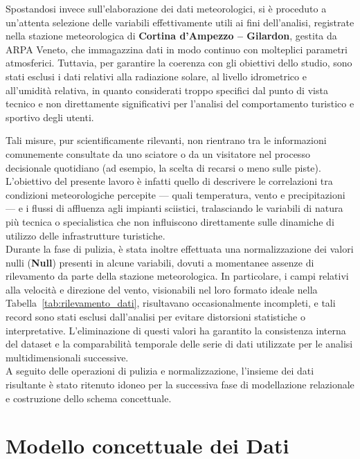 Spostandosi invece sull’elaborazione dei dati meteorologici, si è proceduto a un'attenta selezione delle variabili effettivamente utili ai fini dell’analisi, registrate nella stazione meteorologica di \textbf{Cortina d’Ampezzo – Gilardon}, gestita da ARPA Veneto, che immagazzina dati in modo continuo con  molteplici parametri atmosferici.
Tuttavia, per garantire la coerenza con gli obiettivi dello studio, sono stati esclusi i dati relativi alla radiazione solare, al livello idrometrico e all’umidità relativa, in quanto considerati troppo specifici dal punto di vista tecnico e non direttamente significativi per l’analisi del comportamento turistico e sportivo degli utenti.

Tali misure, pur scientificamente rilevanti, non rientrano tra le informazioni comunemente consultate da uno sciatore o da un visitatore nel processo decisionale quotidiano (ad esempio, la scelta di recarsi o meno sulle piste).
L’obiettivo del presente lavoro è infatti quello di descrivere le correlazioni tra condizioni meteorologiche percepite — quali temperatura, vento e precipitazioni — e i flussi di affluenza agli impianti sciistici, tralasciando le variabili di natura più tecnica o specialistica che non influiscono direttamente sulle dinamiche di utilizzo delle infrastrutture turistiche.\\

Durante la fase di pulizia, è stata inoltre effettuata una normalizzazione dei valori nulli (\textbf{Null}) presenti in alcune variabili, dovuti a momentanee assenze di rilevamento da parte della stazione meteorologica.
In particolare, i campi relativi alla velocità e direzione del vento, visionabili nel loro formato ideale nella Tabella~\ref{tab:rilevamento_dati}, risultavano occasionalmente incompleti, e tali record sono stati esclusi dall’analisi per evitare distorsioni statistiche o interpretative.
L’eliminazione di questi valori ha garantito la consistenza interna del dataset e la comparabilità temporale delle serie di dati utilizzate per le analisi multidimensionali successive.\\

A seguito delle operazioni di pulizia e normalizzazione, l’insieme dei dati risultante è stato ritenuto idoneo per la successiva fase di modellazione relazionale e costruzione dello schema concettuale.





\section{Modello concettuale dei Dati}

